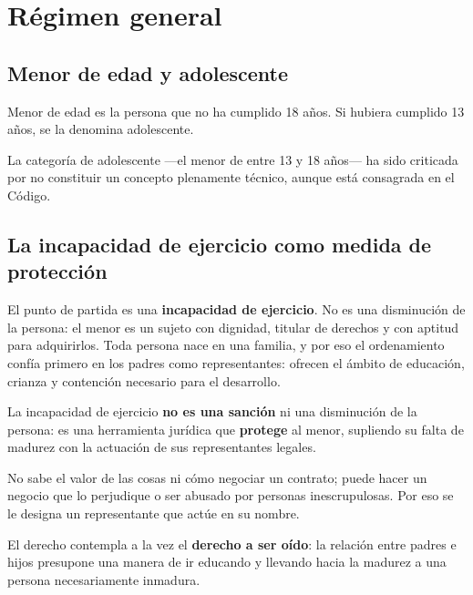 \documentclass[12pt,oneside]{book}
\begin{document}
\section{Régimen general}

\subsection{Menor de edad y adolescente}

\begin{regla}
Menor de edad es la persona que no ha cumplido 18 años. Si hubiera cumplido 13 años, se la denomina adolescente.
\end{regla}

La categoría de adolescente ---el menor de entre 13 y 18 años--- ha sido criticada por no constituir un concepto plenamente técnico, aunque está consagrada en el Código.

\subsection{La incapacidad de ejercicio como medida de protección}

El punto de partida es una \textbf{incapacidad de ejercicio}. No es una disminución de la persona: el menor es un sujeto con dignidad, titular de derechos y con aptitud para adquirirlos. Toda persona nace en una familia, y por eso el ordenamiento confía primero en los padres como representantes: ofrecen el ámbito de educación, crianza y contención necesario para el desarrollo.

\begin{importante}
La incapacidad de ejercicio \textbf{no es una sanción} ni una disminución de la persona: es una herramienta jurídica que \textbf{protege} al menor, supliendo su falta de madurez con la actuación de sus representantes legales.
\end{importante}

\begin{ejemplo}
No sabe el valor de las cosas ni cómo negociar un contrato; puede hacer un negocio que lo perjudique o ser abusado por personas inescrupulosas. Por eso se le designa un representante que actúe en su nombre.
\end{ejemplo}

El derecho contempla a la vez el \textbf{derecho a ser oído}: la relación entre padres e hijos presupone una manera de ir educando y llevando hacia la madurez a una persona necesariamente inmadura.
\end{document}
